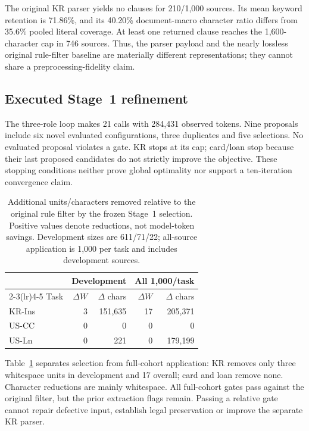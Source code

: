 \documentclass[11pt]{article}
\begin{document}
The original KR parser yields no clauses for 210/1,000 sources.
Its mean keyword retention is 71.86\%, and its 40.20\% document-macro
character ratio differs from 35.6\% pooled literal coverage.
At least one returned clause reaches the 1,600-character cap in 746
sources. Thus, the parser payload and the nearly lossless original
rule-filter baseline are materially different representations; they
cannot share a preprocessing-fidelity claim.

\subsection{Executed Stage~1 refinement}
The three-role loop makes 21 calls with 284,431 observed tokens.
Nine proposals include six novel evaluated configurations, three
duplicates and five selections. No evaluated proposal violates a gate.
KR stops at its cap; card/loan stop because their last proposed candidates
do not strictly improve the objective. These stopping conditions neither
prove global optimality nor support a ten-iteration convergence claim.

\begin{table}[t]
\centering\small\setlength{\tabcolsep}{4pt}
\begin{tabular}{lrrrr}
\toprule
 & \multicolumn{2}{c}{Development} & \multicolumn{2}{c}{All 1,000/task} \\
\cmidrule(lr){2-3}\cmidrule(lr){4-5}
Task & $\Delta W$ & $\Delta$ chars & $\Delta W$ & $\Delta$ chars \\
\midrule
KR-Ins & 3 & 151,635 & 17 & 205,371 \\
US-CC  & 0 & 0       & 0  & 0 \\
US-Ln  & 0 & 221     & 0  & 179,199 \\
\bottomrule
\end{tabular}
\caption{Additional units/characters removed relative to the original
rule filter by the frozen Stage~1 selection. Positive values denote
reductions, not model-token savings. Development sizes are 611/71/22;
all-source application is 1,000 per task and includes development sources.}
\label{tab:stage1}
\end{table}

Table~\ref{tab:stage1} separates selection from full-cohort application:
KR removes only three whitespace units in development and 17 overall;
card and loan remove none. Character reductions are mainly whitespace.
All full-cohort gates pass against the original filter, but the prior
extraction flags remain. Passing a relative gate cannot repair defective
input, establish legal preservation or improve the separate KR parser.
\end{document}
